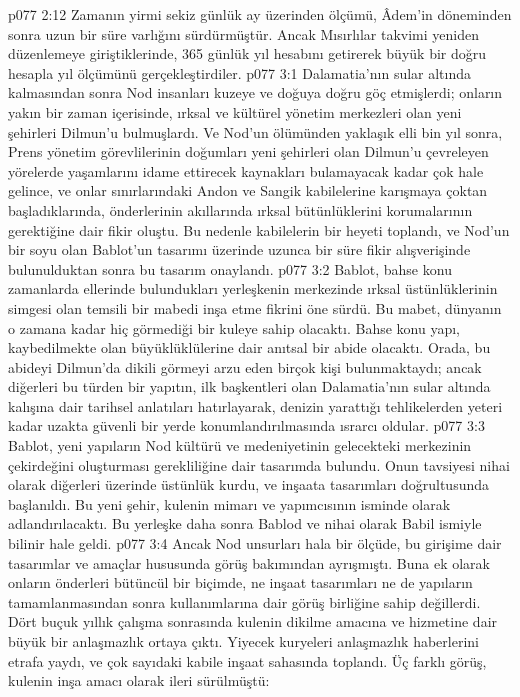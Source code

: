 \vs p077 2:12 Zamanın yirmi sekiz günlük ay üzerinden ölçümü, Âdem’in döneminden sonra uzun bir süre varlığını sürdürmüştür. Ancak Mısırlılar takvimi yeniden düzenlemeye giriştiklerinde, 365 günlük yıl hesabını getirerek büyük bir doğru hesapla yıl ölçümünü gerçekleştirdiler.
\vs p077 3:1 Dalamatia’nın sular altında kalmasından sonra Nod insanları kuzeye ve doğuya doğru göç etmişlerdi; onların yakın bir zaman içerisinde, ırksal ve kültürel yönetim merkezleri olan yeni şehirleri Dilmun’u bulmuşlardı. Ve Nod’un ölümünden yaklaşık elli bin yıl sonra, Prens yönetim görevlilerinin doğumları yeni şehirleri olan Dilmun’u çevreleyen yörelerde yaşamlarını idame ettirecek kaynakları bulamayacak kadar çok hale gelince, ve onlar sınırlarındaki Andon ve Sangik kabilelerine karışmaya çoktan başladıklarında, önderlerinin akıllarında ırksal bütünlüklerini korumalarının gerektiğine dair fikir oluştu. Bu nedenle kabilelerin bir heyeti toplandı, ve Nod’un bir soyu olan Bablot’un tasarımı üzerinde uzunca bir süre fikir alışverişinde bulunulduktan sonra bu tasarım onaylandı.
\vs p077 3:2 Bablot, bahse konu zamanlarda ellerinde bulundukları yerleşkenin merkezinde ırksal üstünlüklerinin simgesi olan temsili bir mabedi inşa etme fikrini öne sürdü. Bu mabet, dünyanın o zamana kadar hiç görmediği bir kuleye sahip olacaktı. Bahse konu yapı, kaybedilmekte olan büyüklüklülerine dair anıtsal bir abide olacaktı. Orada, bu abideyi Dilmun’da dikili görmeyi arzu eden birçok kişi bulunmaktaydı; ancak diğerleri bu türden bir yapıtın, ilk başkentleri olan Dalamatia’nın sular altında kalışına dair tarihsel anlatıları hatırlayarak, denizin yarattığı tehlikelerden yeteri kadar uzakta güvenli bir yerde konumlandırılmasında ısrarcı oldular.
\vs p077 3:3 Bablot, yeni yapıların Nod kültürü ve medeniyetinin gelecekteki merkezinin çekirdeğini oluşturması gerekliliğine dair tasarımda bulundu. Onun tavsiyesi nihai olarak diğerleri üzerinde üstünlük kurdu, ve inşaata tasarımları doğrultusunda başlanıldı. Bu yeni şehir, kulenin mimarı ve yapımcısının isminde  olarak adlandırılacaktı. Bu yerleşke daha sonra Bablod ve nihai olarak Babil ismiyle bilinir hale geldi.
\vs p077 3:4 Ancak Nod unsurları hala bir ölçüde, bu girişime dair tasarımlar ve amaçlar hususunda görüş bakımından ayrışmıştı. Buna ek olarak onların önderleri bütüncül bir biçimde, ne inşaat tasarımları ne de yapıların tamamlanmasından sonra kullanımlarına dair görüş birliğine sahip değillerdi. Dört buçuk yıllık çalışma sonrasında kulenin dikilme amacına ve hizmetine dair büyük bir anlaşmazlık ortaya çıktı. Yiyecek kuryeleri anlaşmazlık haberlerini etrafa yaydı, ve çok sayıdaki kabile inşaat sahasında toplandı. Üç farklı görüş, kulenin inşa amacı olarak ileri sürülmüştü:

